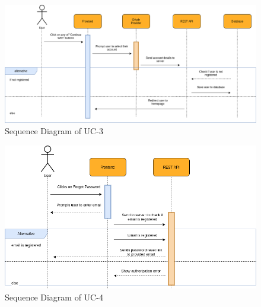         \begin{figure}[H]
            \centering
            \includegraphics[scale=0.5]{./diagrams/sequence/seq-03.png}
            \caption{Sequence Diagram of UC-3}
            \label{fig:seq-03}
            
        \end{figure}
    

        \begin{figure}[H]
            \centering
            \includegraphics[scale=0.5]{./diagrams/sequence/seq-04.png}
            \caption{Sequence Diagram of UC-4}
            \label{fig:seq-04}
            
        \end{figure}
    

